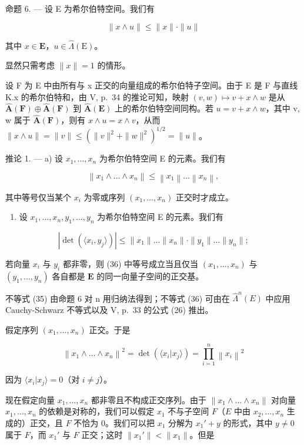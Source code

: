 命题 6. --- 设 E 为希尔伯特空间。我们有

\[
\| x \wedge u \| \leqslant \| x \| \cdot \| u \|\tag{34}
\]

其中 \(x\in \mathbf{E}\)，\(u\in \hat{\Lambda} (\mathrm{E})\)。

显然只需考虑 \(\| x\| = 1\) 的情形。

设 F 为 E 中由所有与 x 正交的向量组成的希尔伯特子空间。由于 E 是 F 与直线 K.x 的希尔伯特和，由 V, p.~34 的推论可知，映射 \((v,w)\mapsto v+x\wedge w\) 是从 \(\hat{\mathbf{A}}(\mathbf{F})\oplus\hat{\mathbf{A}}(\mathbf{F})\) 到 \(\hat{\mathbf{A}}(\mathbf{E})\) 上的希尔伯特空间同构。若 \(u=v+x\wedge w\)，其中 v, w 属于 \(\hat{\mathbf{A}}(\mathbf{F})\)，则有 \(x\wedge u=x\wedge v\)，从而 \(\|x\wedge u\|=\|v\|\leqslant(\|v\|^{2}+\|w\|^{2})^{1/2}=\|u\|\)。

推论 1. --- a) 设 \(x_1, \ldots, x_n\) 为希尔伯特空间 E 的元素。我们有

\[
\left\| x _ {1} \wedge \dots \wedge x _ {n} \right\| \leqslant \left\| x _ {1} \right\| \dots \left\| x _ {n} \right\|,\tag{35}
\]

其中等号仅当某个 \(x_{i}\) 为零或序列 \((x_{1},\dots,x_{n})\) 正交时才成立。

\begin{enumerate}
\def\labelenumi{\alph{enumi})}
\setcounter{enumi}{1}
\tightlist
\item
  设 \(x_{1}, \ldots, x_{n}, y_{1}, \ldots, y_{n}\) 为希尔伯特空间 E 的元素。我们有
\end{enumerate}

\[
\left| \det (\langle x _ {i}, y _ {j} \rangle) \right| \leqslant \| x _ {1} \| \dots \| x _ {n} \| \cdot \| y _ {1} \| \dots \| y _ {n} \|;\tag{36}
\]

若向量 \(x_{i}\) 与 \(y_{i}\) 都非零，则 (36) 中等号成立当且仅当 \((x_{1},\ldots ,x_{n})\) 与 \((y_{1},\dots,y_{n})\) 各自都是 \(\mathbf{E}\) 的同一向量子空间的正交基。

不等式 (35) 由命题 6 对 n 用归纳法得到；不等式 (36) 可由在 \(\hat{\Lambda}^{n}(E)\) 中应用 Cauchy-Schwarz 不等式以及 V, p.~33 的公式 (26) 推出。

假定序列 \((x_{1},\dots,x_{n})\) 正交。于是

\[
\left\| x _ {1} \wedge \dots \wedge x _ {n} \right\| ^ {2} = \det (\langle x _ {i} | x _ {j} \rangle) = \prod_ {i = 1} ^ {n} \left\| x _ {i} \right\| ^ {2}
\]

因为 \(\langle x_i|x_j\rangle = 0\)（对 \(i\neq j\)）。

现在假定向量 \(x_{1}, \ldots, x_{n}\) 都非零且不构成正交序列。由于 \(\| x_{1} \wedge \ldots \wedge x_{n} \|\) 对向量 \(x_{1}, \ldots, x_{n}\) 的依赖是对称的，我们可以假定 \(x_{1}\) 不与子空间 \(F\)（\(E\) 中由 \(x_{2}, \ldots, x_{n}\) 生成的）正交，且 \(F\) 不恰为 0。我们可以把 \(x_{1}\) 分解为 \(x_{1}' + y\) 的形式，其中 \(y \neq 0\) 属于 \(F\)，而 \(x_{1}'\) 与 \(F\) 正交；这时 \(\| x_{1}' \| < \| x_{1} \|\)。但是

